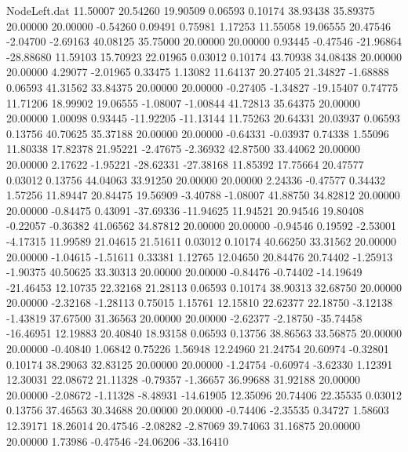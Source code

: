 \begin{filecontents}{NodeLeft.dat}
  11.50007   20.54260   19.90509     0.06593    0.10174   38.93438   35.89375   20.00000   20.00000   -0.54260    0.09491    0.75981    1.17253
  11.55058   19.06555   20.47546    -2.04700   -2.69163   40.08125   35.75000   20.00000   20.00000    0.93445   -0.47546  -21.96864  -28.88680
  11.59103   15.70923   22.01965     0.03012    0.10174   43.70938   34.08438   20.00000   20.00000    4.29077   -2.01965    0.33475    1.13082
  11.64137   20.27405   21.34827    -1.68888    0.06593   41.31562   33.84375   20.00000   20.00000   -0.27405   -1.34827  -19.15407    0.74775
  11.71206   18.99902   19.06555    -1.08007   -1.00844   41.72813   35.64375   20.00000   20.00000    1.00098    0.93445  -11.92205  -11.13144
  11.75263   20.64331   20.03937     0.06593    0.13756   40.70625   35.37188   20.00000   20.00000   -0.64331   -0.03937    0.74338    1.55096
  11.80338   17.82378   21.95221    -2.47675   -2.36932   42.87500   33.44062   20.00000   20.00000    2.17622   -1.95221  -28.62331  -27.38168
  11.85392   17.75664   20.47577     0.03012    0.13756   44.04063   33.91250   20.00000   20.00000    2.24336   -0.47577    0.34432    1.57256
  11.89447   20.84475   19.56909    -3.40788   -1.08007   41.88750   34.82812   20.00000   20.00000   -0.84475    0.43091  -37.69336  -11.94625
  11.94521   20.94546   19.80408    -0.22057   -0.36382   41.06562   34.87812   20.00000   20.00000   -0.94546    0.19592   -2.53001   -4.17315
  11.99589   21.04615   21.51611     0.03012    0.10174   40.66250   33.31562   20.00000   20.00000   -1.04615   -1.51611    0.33381    1.12765
  12.04650   20.84476   20.74402    -1.25913   -1.90375   40.50625   33.30313   20.00000   20.00000   -0.84476   -0.74402  -14.19649  -21.46453
  12.10735   22.32168   21.28113     0.06593    0.10174   38.90313   32.68750   20.00000   20.00000   -2.32168   -1.28113    0.75015    1.15761
  12.15810   22.62377   22.18750    -3.12138   -1.43819   37.67500   31.36563   20.00000   20.00000   -2.62377   -2.18750  -35.74458  -16.46951
  12.19883   20.40840   18.93158     0.06593    0.13756   38.86563   33.56875   20.00000   20.00000   -0.40840    1.06842    0.75226    1.56948
  12.24960   21.24754   20.60974    -0.32801    0.10174   38.29063   32.83125   20.00000   20.00000   -1.24754   -0.60974   -3.62330    1.12391
  12.30031   22.08672   21.11328    -0.79357   -1.36657   36.99688   31.92188   20.00000   20.00000   -2.08672   -1.11328   -8.48931  -14.61905
  12.35096   20.74406   22.35535     0.03012    0.13756   37.46563   30.34688   20.00000   20.00000   -0.74406   -2.35535    0.34727    1.58603
  12.39171   18.26014   20.47546    -2.08282   -2.87069   39.74063   31.16875   20.00000   20.00000    1.73986   -0.47546  -24.06206  -33.16410

\end{filecontents}
